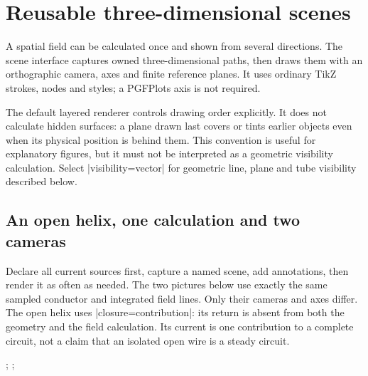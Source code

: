 \section{Reusable three-dimensional scenes}
\label{sec:view-3d}

A spatial field can be calculated once and shown from several directions.
The scene interface captures owned three-dimensional paths, then draws them
with an orthographic camera, axes and finite reference planes. It uses ordinary
TikZ strokes, nodes and styles; a PGFPlots axis is not required.

The default layered renderer controls drawing order explicitly. It does not calculate
hidden surfaces: a plane drawn last covers or tints earlier objects even when
its physical position is behind them. This convention is useful for explanatory
figures, but it must not be interpreted as a geometric visibility calculation.
Select |visibility=vector| for geometric line, plane and tube visibility described below.

\subsection{An open helix, one calculation and two cameras}
Declare all current sources first, capture a named scene, add annotations, then
render it as often as needed. The two pictures below use exactly the same
sampled conductor and integrated field lines. Only their cameras and axes differ.
The open helix uses |closure=contribution|: its return is absent from both the
geometry and the field calculation. Its current is one contribution to a
complete circuit, not a claim that an isolated open wire is a steady circuit.
\begin{codeexample}[width=0pt]
\begingroup
\tikzpicture[femm/biot,
 femm/biot view={seeds={0/.3/0;0/-.3/0},
 step=.15,maximum length=8}]
 \femmbiotsource[kind=solenoid,winding=helix,
  closure=contribution,current=2,radius=.8,length=2,turns=4]
 \femmbiotscene[name=course-coil]
\endtikzpicture
\femmviewplane[scene=course-coil,plane=xy,
 umin=-1.2,umax=1.2,vmin=-1.2,vmax=1.2,
 grid=major,step=.4,label={$z=0$}]
\tikzpicture[femm/view 3d={scene=course-coil,
 xmin=-2,xmax=2,ymin=-2,ymax=2,zmin=-2,zmax=2,
 coordinate scale=.7}]
 ;
\endtikzpicture
\quad
\tikzpicture[femm/view 3d={scene=course-coil,
 xmin=-2,xmax=2,ymin=-2,ymax=2,zmin=-2,zmax=2,
 coordinate scale=.7,axes=box,azimuth=25,elevation=20}]
 ;
\endtikzpicture
{}
\endgroup
\end{codeexample}

